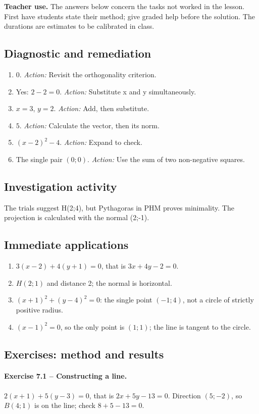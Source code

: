 \label{C07-CORR}
\textbf{Teacher use.} The answers below concern the tasks not worked in the lesson. First have students state their method; give graded help before the solution. The durations are estimates to be calibrated in class.
\subsection*{Diagnostic and remediation}
\begin{enumerate}
\item $0$. \textit{Action:} Revisit the orthogonality criterion.
\item Yes: $2-2=0$. \textit{Action:} Substitute x and y simultaneously.
\item $x=3$, $y=2$. \textit{Action:} Add, then substitute.
\item $5$. \textit{Action:} Calculate the vector, then its norm.
\item $(x-2)^2-4$. \textit{Action:} Expand to check.
\item The single pair $(0;0)$. \textit{Action:} Use the sum of two non-negative squares.
\end{enumerate}
\subsection*{Investigation activity}
The trials suggest H(2;4), but Pythagoras in PHM proves minimality. The projection is calculated with the normal (2;-1).
\subsection*{Immediate applications}
\begin{enumerate}
\item $3(x-2)+4(y+1)=0$, that is $3x+4y-2=0$.
\item $H(2;1)$ and distance 2; the normal is horizontal.
\item $(x+1)^2+(y-4)^2=0$: the single point $(-1;4)$, not a circle of strictly positive radius.
\item $(x-1)^2=0$, so the only point is $(1;1)$; the line is tangent to the circle.
\end{enumerate}
\subsection*{Exercises: method and results}
\paragraph{Exercise 7.1 -- Constructing a line.} $2(x+1)+5(y-3)=0$, that is $2x+5y-13=0$. Direction $(5;-2)$, so $B(4;1)$ is on the line; check $8+5-13=0$.
